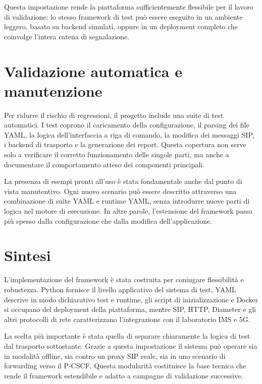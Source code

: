 Questa impostazione rende la piattaforma sufficientemente flessibile per il lavoro di validazione: lo stesso framework di test pu\`o essere eseguito in un ambiente leggero, basato su backend simulati, oppure in un deployment completo che coinvolge l'intera catena di segnalazione.

\section{Validazione automatica e manutenzione}

Per ridurre il rischio di regressioni, il progetto include una suite di test automatici. I test coprono il caricamento della configurazione, il parsing dei file YAML, la logica dell'interfaccia a riga di comando, la modifica dei messaggi SIP, i backend di trasporto e la generazione dei report. Questa copertura non serve solo a verificare il corretto funzionamento delle singole parti, ma anche a documentare il comportamento atteso dei componenti principali.

La presenza di esempi pronti all'uso \`e stata fondamentale anche dal punto di vista manutentivo. Ogni nuovo scenario pu\`o essere descritto attraverso una combinazione di suite YAML e runtime YAML, senza introdurre nuove parti di logica nel motore di esecuzione. In altre parole, l'estensione del framework passa pi\`u spesso dalla configurazione che dalla modifica dell'applicazione.

\section{Sintesi}

L'implementazione del framework \`e stata costruita per coniugare flessibilit\`a e robustezza. Python fornisce il livello applicativo del sistema di test, YAML descrive in modo dichiarativo test e runtime, gli script di inizializzazione e Docker si occupano del deployment della piattaforma, mentre SIP, HTTP, Diameter e gli altri protocolli di rete caratterizzano l'integrazione con il laboratorio IMS e 5G.

La scelta pi\`u importante \`e stata quella di separare chiaramente la logica di test dal trasporto sottostante. Grazie a questa impostazione il sistema pu\`o operare sia in modalit\`a offline, sia contro un proxy SIP reale, sia in uno scenario di forwarding verso il P-CSCF. Questa modularit\`a costituisce la base tecnica che rende il framework estendibile e adatto a campagne di validazione successive.
